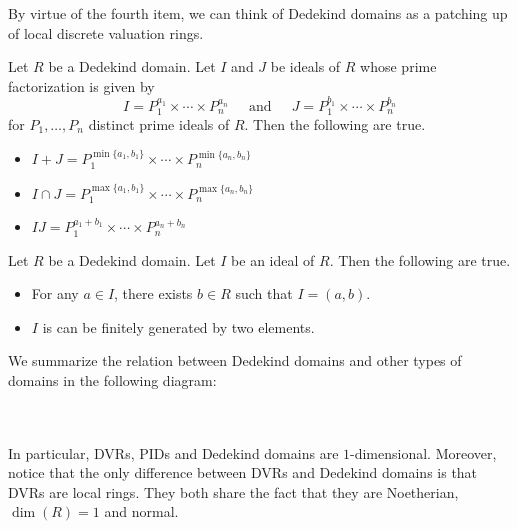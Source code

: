 \documentclass[a4paper]{article}
\begin{document}
By virtue of the fourth item, we can think of Dedekind domains as a patching up of local discrete valuation rings. 

\begin{prp}{}{} Let $R$ be a Dedekind domain. Let $I$ and $J$ be ideals of $R$ whose prime factorization is given by $$I=P_1^{a_1}\times\cdots\times P_n^{a_n}\;\;\;\;\text{ and }\;\;\;\;J=P_1^{b_1}\times\cdots\times P_n^{b_n}$$ for $P_1,\dots,P_n$ distinct prime ideals of $R$. Then the following are true. 
\begin{itemize}
\item $I+J=P_1^{\min\{a_1,b_1\}}\times\cdots\times P_n^{\min\{a_n,b_n\}}$
\item $I\cap J=P_1^{\max\{a_1,b_1\}}\times\cdots\times P_n^{\max\{a_n,b_n\}}$
\item $IJ=P_1^{a_1+b_1}\times\cdots\times P_n^{a_n+b_n}$
\end{itemize}
\end{prp}

\begin{prp}{}{} Let $R$ be a Dedekind domain. Let $I$ be an ideal of $R$. Then the following are true. 
\begin{itemize}
\item For any $a\in I$, there exists $b\in R$ such that $I=(a,b)$. 
\item $I$ is can be finitely generated by two elements. 
\end{itemize}
\end{prp}



We summarize the relation between Dedekind domains and other types of domains in the following diagram: 

 \\~\\

In particular, DVRs, PIDs and Dedekind domains are $1$-dimensional. Moreover, notice that the only difference between DVRs and Dedekind domains is that DVRs are local rings. They both share the fact that they are Noetherian, $\dim(R)=1$ and normal. 
\end{document}
